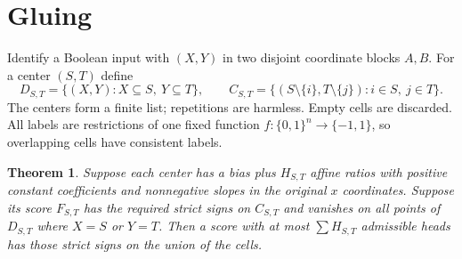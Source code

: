 \documentclass[11pt]{article}
\newtheorem{theorem}{Theorem}
\begin{document}
\section{Gluing}
Identify a Boolean input with $(X,Y)$ in two disjoint coordinate blocks
$A,B$. For a center $(S,T)$ define
\[
D_{S,T}=\{(X,Y):X\subseteq S,\ Y\subseteq T\},\qquad
C_{S,T}=\{(S\setminus\{i\},T\setminus\{j\}):i\in S,\ j\in T\}.
\]
The centers form a finite list; repetitions are harmless. Empty cells
are discarded. All labels are restrictions of one fixed function
$f:\{0,1\}^n\to\{-1,1\}$, so overlapping cells have consistent labels.

\begin{theorem}
Suppose each center has a bias plus $H_{S,T}$ affine ratios with
positive constant coefficients and nonnegative slopes in the original
$x$ coordinates. Suppose its score $F_{S,T}$ has the required strict
signs on $C_{S,T}$ and vanishes on all points of $D_{S,T}$ where
$X=S$ or $Y=T$. Then a score with at most
$\sum H_{S,T}$ admissible heads has those strict signs on the union
of the cells.
\end{theorem}
\end{document}
